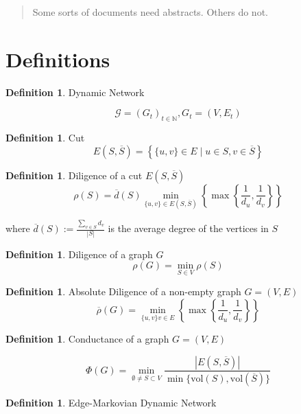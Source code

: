 \documentclass[a4paper,11pt]{article}
\theoremstyle{definition}
\newtheorem{definition}[theorem]{Definition}
\newcommand*\comp[1]{\overline{#1}}
\begin{document}



\begin{abstract}
	Some sorts of documents need abstracts. Others do not.
\end{abstract}
	
	
\tableofcontents

\section{Definitions}

\begin{definition}
	Dynamic Network

	$$
		\mathcal{G} = (G_t)_{t \in \mathbb{N}}, G_t = (V, E_t)
	$$
\end{definition}

\begin{definition}
	Cut
	$$
		E(S, \comp{S}) = \left\{\{u, v\} \in E \mid u \in S, v \in \comp{S} \right\}
	$$
\end{definition}

\begin{definition}
	Diligence of a cut $ E(S, \comp{S}) $
	$$
		\rho(S) = \comp{d}(S) \min_{\{u, v\} \in E(S, \comp{S}) } \left\{ \max \left\{ \frac{1}{d_u},\frac{1}{d_v} \right\} \right\}
	$$ 

	where $\comp{d}(S) := \frac{\sum_{v \in S} d_v}{|S|}$ is the average degree of the vertices in $S$
\end{definition}

\begin{definition}
	Diligence of a graph $G$
	$$
		\rho(G) = \min_{S \in V} \rho(S) 
	$$
\end{definition}

\begin{definition}
	Absolute Diligence of a non-empty graph $G = (V, E)$
	$$
		\comp{\rho}(G) = \min_{\{u, v\}v \in E}\left\{ \max \left\{ \frac{1}{d_u},\frac{1}{d_v} \right\} \right\}
	$$
\end{definition}

\begin{definition}
	Conductance of a graph $G = (V, E)$

	$$
		\Phi(G) = \min_{\emptyset \neq S \subset V} \frac{|E(S, \comp{S})|}{\min\{\text{vol}(S), \text{vol}(\comp{S})\}}
	$$
\end{definition}

\begin{definition}
	Edge-Markovian Dynamic Network

\end{definition}
\end{document}
